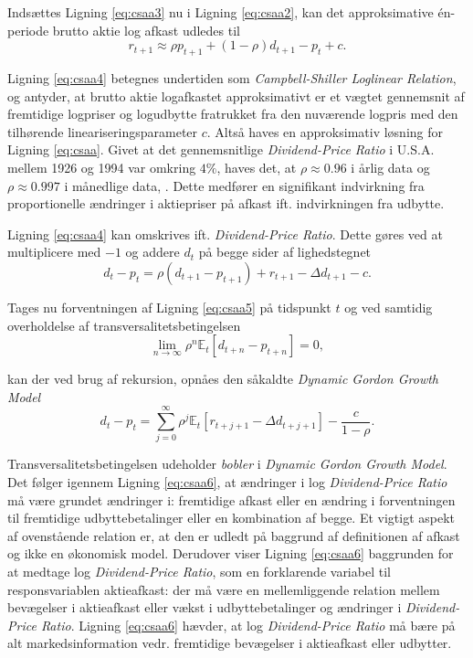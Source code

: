 \documentclass[
  a4paper,
  oneside]{memoir}
\begin{document}
Indsættes Ligning \eqref{eq:csaa3} nu i Ligning \eqref{eq:csaa2}, kan det approksimative én-periode brutto aktie log afkast udledes til
\begin{equation}
r_{t+1}\approx \rho p_{t+1} + (1-\rho)d_{t+1}-p_t+c. \label{eq:csaa4}
\end{equation}

Ligning \eqref{eq:csaa4} betegnes undertiden som \emph{Campbell-Shiller Loglinear Relation}, og antyder, at brutto aktie logafkastet approksimativt er et vægtet gennemsnit af fremtidige logpriser og logudbytte fratrukket fra den nuværende logpris med den tilhørende lineariseringsparameter \(c\). Altså haves en approksimativ løsning for Ligning \eqref{eq:csaa}. Givet at det gennemsnitlige \emph{Dividend-Price Ratio} i U.S.A. mellem 1926 og 1994 var omkring \(4\%\), haves det, at \(\rho\approx 0.96\) i årlig data og \(\rho\approx 0.997\) i månedlige data, \citep{Campbell1997}. Dette medfører en signifikant indvirkning fra proportionelle ændringer i aktiepriser på afkast ift. indvirkningen fra udbytte.

Ligning \eqref{eq:csaa4} kan omskrives ift. \emph{Dividend-Price Ratio}. Dette gøres ved at multiplicere med \(-1\) og addere \(d_t\) på begge sider af lighedstegnet
\begin{equation}
d_t-p_t=\rho(d_{t+1}-p_{t+1}) + r_{t+1} -\Delta d_{t+1}-c. \label{eq:csaa5}
\end{equation}

Tages nu forventningen af Ligning \eqref{eq:csaa5} på tidspunkt \(t\) og ved samtidig overholdelse af transversalitetsbetingelsen
\[\lim_{n\to\infty } \rho^n\mathbb{E}_t\left[d_{t+n}-p_{t+n}\right]= 0,\]

kan der ved brug af rekursion, opnåes den såkaldte \emph{Dynamic Gordon Growth Model}
\begin{equation}
d_t-p_t=\sum_{j=0}^\infty \rho^j \mathbb{E}_t\left[r_{t+j+1}-\Delta d_{t+j+1}\right]-\frac{c}{1-\rho}. \label{eq:csaa6}
\end{equation}

Transversalitetsbetingelsen udeholder \emph{bobler} i \emph{Dynamic Gordon Growth Model}. Det følger igennem Ligning \eqref{eq:csaa6}, at ændringer i log \emph{Dividend-Price Ratio} må være grundet ændringer i: fremtidige afkast eller en ændring i forventningen til fremtidige udbyttebetalinger eller en kombination af begge. Et vigtigt aspekt af ovenstående relation er, at den er udledt på baggrund af definitionen af afkast og ikke en økonomisk model. Derudover viser Ligning \eqref{eq:csaa6} baggrunden for at medtage log \emph{Dividend-Price Ratio}, som en forklarende variabel til responsvariablen aktieafkast: der må være en mellemliggende relation mellem bevægelser i aktieafkast eller vækst i udbyttebetalinger og ændringer i \emph{Dividend-Price Ratio}. Ligning \eqref{eq:csaa6} hævder, at log \emph{Dividend-Price Ratio} må bære på alt markedsinformation vedr. fremtidige bevægelser i aktieafkast eller udbytter.
\end{document}
